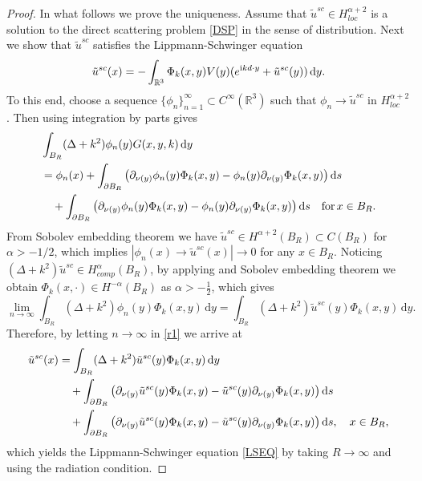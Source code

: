 \documentclass[reqno, 12pt]{amsart}
\numberwithin{equation}{section}
\begin{document}
\begin{proof}
In what follows we prove the uniqueness. 
Assume that $\tilde u^{sc} \in H^{\alpha+2}_{loc}$ is a solution to the direct scattering problem \eqref{DSP} in the sense of distribution. Next we show that $\tilde u^{sc} $ satisfies the Lippmann-Schwinger equation \begin{align}\label{LSEQ}
    \tilde u^{sc}(x)=-\int_{\mathbb R^3}\Phi_k(x,y) V(y)(e^{{\rm i}kd \cdot y}+\tilde u^{sc}(y))\,\mathrm{d}y.
\end{align}
To this end,  
choose a sequence  $\{\phi_n\}_{n=1}^\infty \subset C^\infty(\mathbb R^3)$ such that $\phi_n \to \tilde u^{sc} $ in $H^{\alpha+2}_{loc}$. Then using integration by parts gives \begin{align}\label{r1}
   &\int_{B_R} (\Delta+k^2) \phi_n(y) G(x,y,k)\,\mathrm{d}y \notag\\
   &=\phi_n(x)+\int_{\partial B_R}\left(\partial_{\nu(y)} \phi_n(y) \Phi_k(x,y) - \phi_n(y)\partial_{\nu(y)} \Phi_k(x,y)\right){\rm d}s\notag\\
 &\quad + \int_{\partial B_R} \left(\partial_{\nu (y)}\phi_n(y)  \Phi_k(x,y) - \phi_n(y)\partial_{\nu(y)}  \Phi_k(x,y)\right) {\rm d}s \quad \text{for} \,x \in B_R.
\end{align}
From Sobolev embedding theorem we have $\tilde u^{sc} \in H^{\alpha+2}(B_R) \subset C(B_R)$ for $\alpha>-1/2$, which implies $|\phi_n(x) \to \tilde u^{sc}(x)| 
\to 0$ for any $x \in B_R$. 
Noticing $(\Delta+k^2)\tilde u^{sc} \in H_{comp}^\alpha (B_R)$, by applying \cite[Lemma 3.2]{wang2024stability} and Sobolev embedding theorem we obtain $\Phi_k(x,\cdot) \in H^{-\alpha}(B_R)$ as $\alpha>-\frac{1}{2}$, which gives \[
\lim_{n\to\infty}\int_{B_R} (\Delta+k^2) \phi_n(y) \Phi_k(x,y)\,\mathrm{d}y=\int_{B_R} (\Delta
+k^2) \tilde u^{sc}(y) \Phi_k(x,y)\,\mathrm{d}y. 
\] 
 Therefore, by letting $n \to \infty$ in \eqref{r1} we arrive at \begin{align*}
    \tilde u^{sc}(x) &=\int_{B_R} (\Delta+k^2) \tilde u^{sc}(y) \Phi_k(x,y)\,\mathrm{d}y\\
    &\quad+\int_{\partial B_R}\left(\partial_{\nu(y)}  \tilde u^{sc}(y) \Phi_k(x,y)-\tilde u^{sc}(y)\partial_{\nu(y)} \Phi_k(x,y)\right){\rm d}s\\
 &\quad + \int_{\partial B_R} \left(\partial_{\nu (y)}\tilde u^{sc}(y)  \Phi_k(x,y) - \tilde u^{sc}(y)\partial_{\nu(y)}  \Phi_k(x,y)\right)
 {\rm d}s,\quad x \in B_R,
\end{align*} 
which yields the Lippmann-Schwinger equation \eqref{LSEQ}
by taking $R \to \infty$ and using the radiation condition.


\end{proof}
\end{document}
